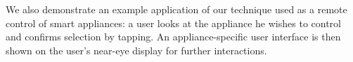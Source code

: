 We also demonstrate an example application of our technique used as a remote control of smart appliances: a user looks at the appliance he wishes to control and confirms selection by tapping. An appliance-specific user interface is then shown on the user's near-eye display for further interactions.






